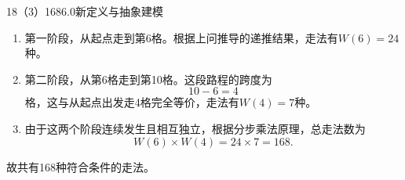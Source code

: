 \begin{solution}{18（3）}{168}{6.0}{新定义与抽象建模}

\begin{enumerate}[label=\textbf{Step \arabic*:},leftmargin=*]
  \item 第一阶段，从起点走到第6格。根据上问推导的递推结果，走法有\(W(6)=24\)种。
  \item 第二阶段，从第6格走到第10格。这段路程的跨度为
  \[
    10-6=4
  \]
  格，这与从起点出发走4格完全等价，走法有\(W(4)=7\)种。
  \item 由于这两个阶段连续发生且相互独立，根据分步乘法原理，总走法数为
  \[
    W(6)\times W(4)=24\times7=168.
  \]
\end{enumerate}
故共有168种符合条件的走法。

\end{solution}
